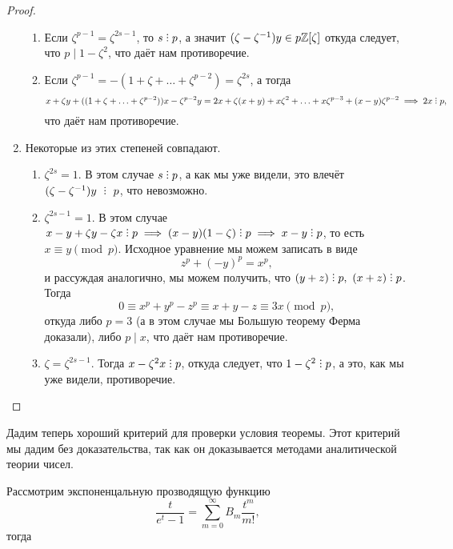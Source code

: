 \begin{proof}
\begin{enumerate}
\begin{enumerate}
 		 		\item Если $\zeta^{p - 1} = \zeta^{2s - 1}$, то $s \divby p$, а значит $(\zeta - \zeta^{-1})y \in p\mathbb{Z}[\zeta]$ откуда следует, что $p \mid 1 - \zeta^2$, что даёт нам противоречие. 

 		 		\item Если $\zeta^{p - 1} = -(1 + \zeta + \ldots + \zeta^{p - 2})= \zeta^{2s}$, а тогда 
 		 		\[
 		 			x + \zeta y + ((1 + \zeta + \ldots + \zeta^{p - 2}))x - \zeta^{p - 2}y = 2x + \zeta(x + y) + x\zeta^2 + \ldots + x\zeta^{p - 3}  + (x - y)\zeta^{p - 2} \implies 2x \divby p,
 		 		\]
 		 		что даёт нам противоречие. 
 		 	\end{enumerate}

 		 	\item Некоторые из этих степеней совпадают. 
 		 		\begin{enumerate}
 		 			\item $\zeta^{2s} = 1$. В этом случае $s \divby p$, а как мы уже видели, это влечёт $(\zeta - \zeta^{-1})y \ \divby \ p$, что невозможно. 

 		 			\item $\zeta^{2s - 1} = 1$.  В этом случае $x - y + \zeta y - \zeta x \divby p \implies (x - y)(1 - \zeta) \divby  p \implies x - y \divby  p$, то есть $x \equiv y \pmod{p}$. Исходное уравнение мы можем записать в виде 
 		 			\[
 		 				z^p + (-y)^p = x^p,
 		 			\]
 		 			и рассуждая аналогично, мы можем получить, что $(y + z) \divby p, \ (x + z) \divby p$. Тогда 
 		 			\[
 		 				0 \equiv x^p + y^p - z^p \equiv x + y - z \equiv 3x \pmod{p},
 		 			\]
 		 			откуда либо $p = 3$ (а в этом случае мы Большую теорему Ферма доказали), либо $p \mid x$, что даёт нам противоречие. 
 		

 		 			\item $\zeta = \zeta^{2s - 1}$. Тогда $x - \zeta^2 x \divby p$, откуда следует, что $1 - \zeta^2 \divby p$, а это, как мы уже видели, противоречие. 
 		 		\end{enumerate}
 		 \end{enumerate}
 		 \end{proof}

 		 Дадим теперь хороший критерий для проверки условия теоремы. Этот критерий мы дадим без доказательства, так как он доказывается методами аналитической теории чисел. 

 		 \begin{definition} 
 		 	Рассмотрим экспоненцальную прозводящую функцию 
 		 	\[
 		 		\frac{t}{e^t - 1} = \sum_{m = 0}^{\infty} B_{m} \frac{t^m}{m!},
 		 	\]
 		 	тогда 
 		 \end{definition}
 		 
